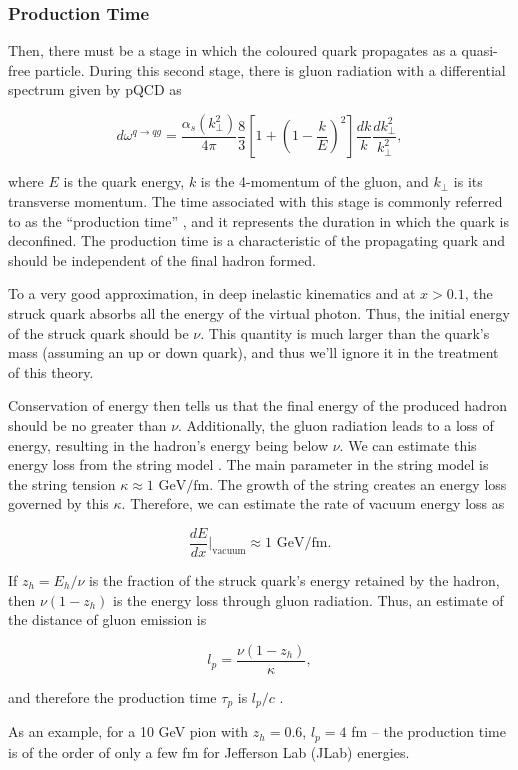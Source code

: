 \subsubsection{Production Time}
\label{10.32::production_time}
    Then, there must be a stage in which the coloured quark propagates as a quasi-free particle.
    During this second stage, there is gluon radiation with a differential spectrum given by pQCD as

    \begin{equation*}
        d\omega^{q \rightarrow qg} =
            \frac{\alpha_s(k_\perp^2)}{4\pi}
            \frac{8}{3}\left[ 1 + \left( 1 - \frac{k}{E} \right)^2 \right]
            \frac{dk}{k} \frac{dk_\perp^2}{k_\perp^2},
    \end{equation*}

    where $E$ is the quark energy, $k$ is the 4-momentum of the gluon, and $k_\perp$ is its transverse momentum.
    The time associated with this stage is commonly referred to as the ``production time'' \cite{kopeliovich2004}, and it represents the duration in which the quark is deconfined.
    The production time is a characteristic of the propagating quark and should be independent of the final hadron formed.

    To a very good approximation, in deep inelastic kinematics and at $x > 0.1$, the struck quark absorbs all the energy of the virtual photon.
    Thus, the initial energy of the struck quark should be $\nu$.
    This quantity is much larger than the quark's mass (assuming an up or down quark), and thus we'll ignore it in the treatment of this theory.

    Conservation of energy then tells us that the final energy of the produced hadron should be no greater than $\nu$.
    Additionally, the gluon radiation leads to a loss of energy, resulting in the hadron's energy being below $\nu$.
    We can estimate this energy loss from the string model \cite{artru1974}.
    The main parameter in the string model is the string tension $\kappa \approx 1 \text{ GeV}/\text{fm}$.
    The growth of the string creates an energy loss governed by this $\kappa$.
    Therefore, we can estimate the rate of vacuum energy loss as

    \begin{equation*}
        \frac{dE}{dx}\Big|_\text{vacuum} \approx 1 \text{ GeV}/\text{fm}.
    \end{equation*}

    If $z_h = E_h/\nu$ is the fraction of the struck quark's energy retained by the hadron, then $\nu(1 - z_h)$ is the energy loss through gluon radiation.
    Thus, an estimate of the distance of gluon emission is

    \begin{equation*}
        l_p = \frac{\nu(1 - z_h)}{\kappa},
    \end{equation*}

    and therefore the production time $\tau_p$ is $l_p/c$ \cite{kopeliovich2004}.

    As an example, for a 10 GeV pion with $z_h = 0.6$, $l_p = 4$ fm -- the production time is of the order of only a few fm for Jefferson Lab (JLab) energies.
